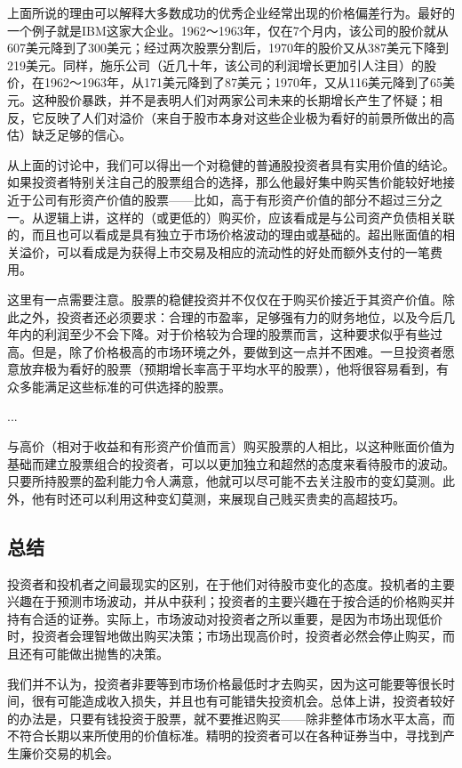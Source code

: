 \documentclass[12pt,oneside]{book}
\begin{document}
上面所说的理由可以解释大多数成功的优秀企业经常出现的价格偏差行为。最好的一个例子就是IBM这家大企业。1962～1963年，仅在7个月内，该公司的股价就从607美元降到了300美元；经过两次股票分割后，1970年的股价又从387美元下降到219美元。同样，施乐公司（近几十年，该公司的利润增长更加引人注目）的股价，在1962～1963年，从171美元降到了87美元；1970年，又从116美元降到了65美元。这种股价暴跌，并不是表明人们对两家公司未来的长期增长产生了怀疑；相反，它反映了人们对溢价（来自于股市本身对这些企业极为看好的前景所做出的高估）缺乏足够的信心。

从上面的讨论中，我们可以得出一个对稳健的普通股投资者具有实用价值的结论。如果投资者特别关注自己的股票组合的选择，那么他最好集中购买售价能较好地接近于公司有形资产价值的股票——比如，高于有形资产价值的部分不超过三分之一。从逻辑上讲，这样的（或更低的）购买价，应该看成是与公司资产负债相关联的，而且也可以看成是具有独立于市场价格波动的理由或基础的。超出账面值的相关溢价，可以看成是为获得上市交易及相应的流动性的好处而额外支付的一笔费用。

这里有一点需要注意。股票的稳健投资并不仅仅在于购买价接近于其资产价值。除此之外，投资者还必须要求：合理的市盈率，足够强有力的财务地位，以及今后几年内的利润至少不会下降。对于价格较为合理的股票而言，这种要求似乎有些过高。但是，除了价格极高的市场环境之外，要做到这一点并不困难。一旦投资者愿意放弃极为看好的股票（预期增长率高于平均水平的股票），他将很容易看到，有众多能满足这些标准的可供选择的股票。

...

与高价（相对于收益和有形资产价值而言）购买股票的人相比，以这种账面价值为基础而建立股票组合的投资者，可以以更加独立和超然的态度来看待股市的波动。只要所持股票的盈利能力令人满意，他就可以尽可能不去关注股市的变幻莫测。此外，他有时还可以利用这种变幻莫测，来展现自己贱买贵卖的高超技巧。



\subsection{总结}
投资者和投机者之间最现实的区别，在于他们对待股市变化的态度。投机者的主要兴趣在于预测市场波动，并从中获利；投资者的主要兴趣在于按合适的价格购买并持有合适的证券。实际上，市场波动对投资者之所以重要，是因为市场出现低价时，投资者会理智地做出购买决策；市场出现高价时，投资者必然会停止购买，而且还有可能做出抛售的决策。

我们并不认为，投资者非要等到市场价格最低时才去购买，因为这可能要等很长时间，很有可能造成收入损失，并且也有可能错失投资机会。总体上讲，投资者较好的办法是，只要有钱投资于股票，就不要推迟购买——除非整体市场水平太高，而不符合长期以来所使用的价值标准。精明的投资者可以在各种证券当中，寻找到产生廉价交易的机会。
\end{document}
